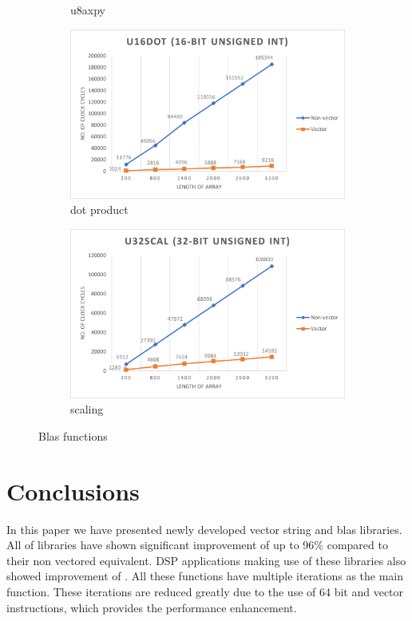 \documentclass[12pt]{article}
\begin{document}
\begin{figure}[H]
\begin{subfigure}[b]{0.4\textwidth}
         \caption{u8axpy}
     \end{subfigure}
       \hfill
     \begin{subfigure}[b]{0.4\textwidth}
         \centering
         \includegraphics[width=\textwidth]{u16dot.png}
         \caption{dot product}
         \end{subfigure}
       \hfill
     \begin{subfigure}[b]{0.4\textwidth}
         \centering
         \includegraphics[width=\textwidth]{u32scal.png}
         \caption{scaling}
     \end{subfigure}
        \caption{Blas functions}
        \label{fig:three graphs}
\end{figure}



\section{Conclusions}
In this paper we have presented newly developed vector string and blas libraries. All of libraries have shown significant improvement of up to 96\% compared to their non vectored equivalent. DSP applications making use of these libraries also showed improvement of . All these functions have multiple iterations as the main function. These iterations are reduced greatly due to the use of 64 bit and vector instructions, which provides the performance enhancement. 
\end{document}
